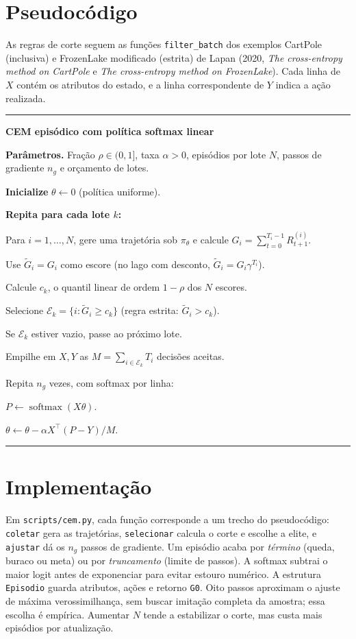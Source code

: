 \documentclass[12pt]{article}
\newenvironment{algoritmo}{\begin{center}\begin{minipage}{0.94\linewidth}\hrule\medskip}{\medskip\hrule\end{minipage}\end{center}}
\begin{document}
\section{Pseudocódigo}

As regras de corte seguem as funções \texttt{filter\_batch} dos exemplos CartPole (inclusiva) e FrozenLake modificado (estrita) de Lapan (2020, \emph{The cross-entropy method on CartPole} e \emph{The cross-entropy method on FrozenLake}). Cada linha de $X$ contém os atributos do estado, e a linha correspondente de $Y$ indica a ação realizada.
\begin{algoritmo}
\textbf{CEM episódico com política softmax linear}

\par\textbf{Parâmetros.} Fração $\rho\in(0,1]$, taxa $\alpha>0$, episódios por lote $N$, passos de gradiente $n_g$ e orçamento de lotes.
\par\textbf{Inicialize} $\theta\gets 0$ (política uniforme).
\par\textbf{Repita para cada lote $k$:}
\par\quad Para $i=1,\ldots,N$, gere uma trajetória sob $\pi_\theta$ e calcule $G_i=\sum_{t=0}^{T_i-1}R_{t+1}^{(i)}$.
\par\quad Use $\widetilde G_i=G_i$ como escore (no lago com desconto, $\widetilde G_i=G_i\gamma^{T_i}$).
\par\quad Calcule $c_k$, o quantil linear de ordem $1-\rho$ dos $N$ escores.
\par\quad Selecione $\mathcal E_k=\{i:\widetilde G_i\ge c_k\}$ (regra estrita: $\widetilde G_i>c_k$).
\par\quad Se $\mathcal E_k$ estiver vazio, passe ao próximo lote.
\par\quad Empilhe em $X,Y$ as $M=\sum_{i\in\mathcal E_k}T_i$ decisões aceitas.
\par\quad Repita $n_g$ vezes, com softmax por linha:
\par\qquad $P\gets\operatorname{softmax}(X\theta)$.
\par\qquad $\theta\gets\theta-\alpha X^\top(P-Y)/M$.
\end{algoritmo}

\section{Implementação}

Em \texttt{scripts/cem.py}, cada função corresponde a um trecho do pseudocódigo: \texttt{coletar} gera as trajetórias, \texttt{selecionar} calcula o corte e escolhe a elite, e \texttt{ajustar} dá os $n_g$ passos de gradiente. Um episódio acaba por \emph{término} (queda, buraco ou meta) ou por \emph{truncamento} (limite de passos). A softmax subtrai o maior logit antes de exponenciar para evitar estouro numérico. A estrutura \texttt{Episodio} guarda atributos, ações e retorno \texttt{G0}. Oito passos aproximam o ajuste de máxima verossimilhança, sem buscar imitação completa da amostra; essa escolha é empírica. Aumentar $N$ tende a estabilizar o corte, mas custa mais episódios por atualização.
\end{document}
